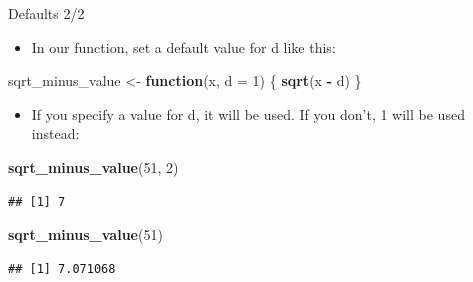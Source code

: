 \documentclass[ignorenonframetext,]{beamer}
\newenvironment{Shaded}{\begin{snugshade}}{\end{snugshade}}
\newcommand{\ControlFlowTok}[1]{\textcolor[rgb]{0.13,0.29,0.53}{\textbf{#1}}}
\newcommand{\DataTypeTok}[1]{\textcolor[rgb]{0.13,0.29,0.53}{#1}}
\newcommand{\DecValTok}[1]{\textcolor[rgb]{0.00,0.00,0.81}{#1}}
\newcommand{\KeywordTok}[1]{\textcolor[rgb]{0.13,0.29,0.53}{\textbf{#1}}}
\newcommand{\NormalTok}[1]{#1}
\newcommand{\OperatorTok}[1]{\textcolor[rgb]{0.81,0.36,0.00}{\textbf{#1}}}
\newcommand{\StringTok}[1]{\textcolor[rgb]{0.31,0.60,0.02}{#1}}
\providecommand{\tightlist}{%
  \setlength{\itemsep}{0pt}\setlength{\parskip}{0pt}}
\begin{document}
\begin{frame}[fragile]{Defaults 2/2}
\protect\hypertarget{defaults-22}{}

\begin{itemize}
\tightlist
\item
  In our function, set a default value for d like this:
\end{itemize}

\begin{Shaded}
\begin{Highlighting}[]
\NormalTok{sqrt_minus_value <-}\StringTok{ }\ControlFlowTok{function}\NormalTok{(x, }\DataTypeTok{d =} \DecValTok{1}\NormalTok{) \{}
  \KeywordTok{sqrt}\NormalTok{(x }\OperatorTok{-}\StringTok{ }\NormalTok{d)}
\NormalTok{\}}
\end{Highlighting}
\end{Shaded}

\begin{itemize}
\tightlist
\item
  If you specify a value for d, it will be used. If you don't, 1 will be
  used instead:
\end{itemize}

\begin{Shaded}
\begin{Highlighting}[]
\KeywordTok{sqrt_minus_value}\NormalTok{(}\DecValTok{51}\NormalTok{, }\DecValTok{2}\NormalTok{)}
\end{Highlighting}
\end{Shaded}

\begin{verbatim}
## [1] 7
\end{verbatim}

\begin{Shaded}
\begin{Highlighting}[]
\KeywordTok{sqrt_minus_value}\NormalTok{(}\DecValTok{51}\NormalTok{)}
\end{Highlighting}
\end{Shaded}

\begin{verbatim}
## [1] 7.071068
\end{verbatim}

\end{frame}
\end{document}
